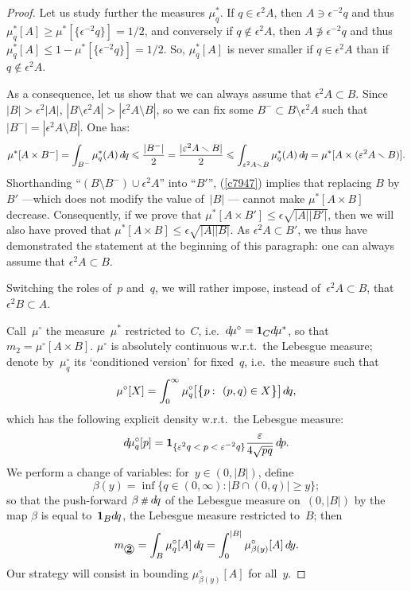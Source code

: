 \begin{proof}
\step Let us study further the measures $\mu^*_q$.
If $q\in\epsilon^2A$, then $A\ni\epsilon^{-2}q$
and thus $\mu^*_q[A] \geq \mu^*[\{\epsilon^{-2}q\}] = 1/2$,
and conversely if $q\notin\epsilon^2A$, then $A\not\ni\epsilon^{-2}q$
and thus $\mu^*_q[A] \leq 1-\mu^*[\{\epsilon^{-2}q\}] = 1/2$.
So, $\mu^*_q[A]$ is never smaller if $q\in\epsilon^2A$
than if $q\notin\epsilon^2A$.

As a consequence, let us show that we can always assume
that $\epsilon^2A \subset B$.
Since $|B|>\epsilon^2|A|$,
$|B\setminus \epsilon^2A| > |\epsilon^2A\setminus B|$,
so we can fix some $B^- \subset B\setminus \epsilon^2A$
such that $|B^-| = |\epsilon^2A\setminus B|$.
One has:
\[\label{c7947}
\mu^*[A\times B^-] = \int_{B^-} \mu^*_q(A) \,\dx{q} \leq \frac{|B^-|}{2} \\
= \frac{|\epsilon^2A\setminus B|}{2}
\leq \int_{\epsilon^2A\setminus B} \mu^*_q(A) \,\dx{q}
= \mu^*[A\times(\epsilon^2A\setminus B)] .
\]
%
Shorthanding ``$(B\setminus B^-)\cup\epsilon^2A$'' into ``$B'$'', (\ref{c7947}) implies that
replacing $B$ by~$B'$ —which does not modify the value of~$|B|$ —%
cannot make $\mu^*[A\times B]$ decrease.
Consequently, if we prove that ${\mu^*[A\times B']} \leq \epsilon\sqrt{|A||B'|}$,
then we will also have proved that $\mu^*[A\times B] \leq \epsilon\sqrt{|A||B|}$.
As $\epsilon^2A\subset B'$, we thus have demonstrated the statement
at the beginning of this paragraph:
one can always assume that $\epsilon^2A\subset B$.

\begin{NOTA}
Switching the roles of~$p$ and~$q$, we will rather impose,
instead of~$\epsilon^2A\subset B$, that $\epsilon^2B\subset A$.
\end{NOTA}

\step Call~$\mu^{\circ}$ the measure~$\mu^*$ restricted to~$C$,
i.e.\ $\dx\mu^{\circ} = \1{C}\dx\mu^*$,
so that $m_2 = \mu^{\circ}[A\times B]$.
$\mu^{\circ}$ is absolutely continuous w.r.t.\ the Lebesgue measure;
denote by~$\mu^{\circ}_q$ its `conditioned version' for fixed~$q$,
i.e.\ the measure such that
\[ \mu^{\circ}[X] = \int_0^\infty \mu^{\circ}_q \big[\big\{p\colon (p,q)\in X\big\}\big] \,\dx{q} ,\]
which has the following explicit density w.r.t.\ the Lebesgue measure:
\[ \label{for5093} \dx\mu^{\circ}_q[p] =
\1{\{\epsilon^2q<p<\epsilon^{-2}q\}} \frac{\epsilon}{4\sqrt{pq}} \,\dx{p} .\]
%
We perform a change of variables:
for~$y\in(0,|B|)$, define
\[ \beta(y) = \inf\big\{ q\in(0,\infty) \colon |B\cap(0,q)| \geq y \big\} ;\]
so that the push-forward $\beta\pushfwd\dx{q}$
of the Lebesgue measure on~$(0,|B|)$ by the map $\beta$
is equal to~$\1{B}\dx{q}$, the Lebesgue measure restricted to~$B$;
then
\[ m_\text{\twocirc} = \int_B \mu^{\circ}_q[A] \,\dx{q} =
\int_0^{|B|} \mu^{\circ}_{\beta(y)}[A] \,\dx{y} .\]
Our strategy will consist in bounding $\mu^{\circ}_{\beta(y)}[A]$ for all~$y$.


\end{proof}
